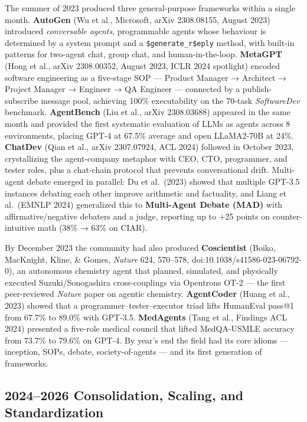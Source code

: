 The summer of 2023 produced three general-purpose frameworks within a single month. \textbf{AutoGen} (Wu et al., Microsoft, arXiv 2308.08155, August 2023) introduced \emph{conversable agents}, programmable agents whose behaviour is determined by a system prompt and a \texttt{\$generate\_r\$eply} method, with built-in patterns for two-agent chat, group chat, and human-in-the-loop. \textbf{MetaGPT} (Hong et al., arXiv 2308.00352, August 2023, ICLR 2024 spotlight) encoded software engineering as a five-stage SOP --- Product Manager → Architect → Project Manager → Engineer → QA Engineer --- connected by a publish-subscribe message pool, achieving 100\% executability on the 70-task \emph{SoftwareDev} benchmark. \textbf{AgentBench} (Liu et al., arXiv 2308.03688) appeared in the same month and provided the first systematic evaluation of LLMs as agents across 8 environments, placing GPT-4 at 67.5\% average and open LLaMA2-70B at 24\%. \textbf{ChatDev} (Qian et al., arXiv 2307.07924, ACL 2024) followed in October 2023, crystallizing the agent-company metaphor with CEO, CTO, programmer, and tester roles, plus a chat-chain protocol that prevents conversational drift. Multi-agent debate emerged in parallel: Du et al.~(2023) showed that multiple GPT-3.5 instances debating each other improve arithmetic and factuality, and Liang et al.~(EMNLP 2024) generalized this to \textbf{Multi-Agent Debate (MAD)} with affirmative/negative debaters and a judge, reporting up to +25 points on counter-intuitive math (38\% → 63\% on CIAR).

By December 2023 the community had also produced \textbf{Coscientist} (Boiko, MacKnight, Kline, \& Gomes, \emph{Nature} 624, 570--578, doi:10.1038/s41586-023-06792-0), an autonomous chemistry agent that planned, simulated, and physically executed Suzuki/Sonogashira cross-couplings via Opentrons OT-2 --- the first peer-reviewed \emph{Nature} paper on agentic chemistry. \textbf{AgentCoder} (Huang et al., 2023) showed that a programmer--tester--executor triad lifts HumanEval pass@1 from 67.7\% to 89.0\% with GPT-3.5. \textbf{MedAgents} (Tang et al., Findings ACL 2024) presented a five-role medical council that lifted MedQA-USMLE accuracy from 73.7\% to 79.6\% on GPT-4. By year's end the field had its core idioms --- inception, SOPs, debate, society-of-agents --- and its first generation of frameworks.

\subsection{2024--2026 Consolidation, Scaling, and Standardization}\label{consolidation-scaling-and-standardization}

